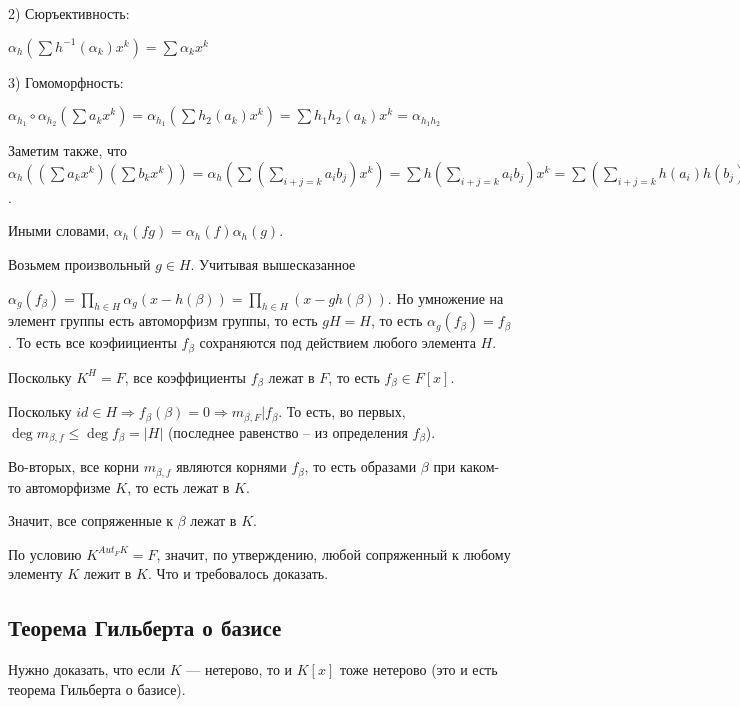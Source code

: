 \documentclass[../main.tex]{subfiles}
\begin{document}
    2) Сюръективность:

    $\alpha_h(\sum h^{-1}(\alpha_k) x^k) = \sum \alpha_kx^k$

    3) Гомоморфность:

    $\alpha_{h_1} \circ \alpha_{h_2}(\sum a_k x^k)
    = \alpha_{h_1}(\sum h_2(a_k) x^k) = \sum h_1 h_2 (a_k) x^k
    = \alpha_{h_1 h_2}$

    Заметим также, что $\alpha_h((\sum a_k x^k)(\sum b_kx^k))
    = \alpha_h(\sum (\sum\limits_{i + j = k} a_ib_j)x^k)
    = \sum h(\sum\limits_{i + j = k} a_ib_j)x^k
    = \sum (\sum\limits_{i + j = k} h(a_i)h(b_j)) x^k
    = (\sum h(a_k)x^k)(\sum h(b_k)x^k)
    = \alpha_h(\sum a_kx^k)\alpha_h(\sum b_kx^k)$.

    Иными словами, $\alpha_h(fg) = \alpha_h(f)\alpha_h(g)$.

    Возьмем произвольный $g \in H$. Учитывая вышесказанное

    $\alpha_g(f_\beta) = \prod\limits_{h \in H} \alpha_g(x - h(\beta))
    =  \prod\limits_{h \in H} (x - gh(\beta))$. Но умножение на элемент
    группы есть автоморфизм группы, то есть $gH = H$, то есть
    $\alpha_g(f_\beta) = f_\beta$. То есть все коэфиициенты $f_\beta$
    сохраняются под действием любого элемента $H$.

    Поскольку $K^H = F$, все
    коэффициенты $f_\beta$ лежат в $F$, то есть $f_\beta \in F[x]$.

    Поскольку  $id \in H \Rightarrow f_\beta(\beta) = 0 \Rightarrow
    m_{\beta, F} | f_\beta$. То есть, во первых, $\deg m_{\beta, f} \leqslant
    \deg f_\beta = |H|$ (последнее равенство -- из определения $f_\beta$).

    Во-вторых, все корни $m_{\beta, f}$ являются корнями $f_\beta$, то есть
    образами $\beta$ при каком-то автоморфизме $K$, то есть лежат в $K$.

    Значит, все сопряженные к $\beta$ лежат в $K$.

    По условию $K^{Aut_FK} = F$, значит, по утверждению, любой сопряженный к
    любому элементу $K$ лежит в $K$. Что и требовалось доказать.



\hypertarget{9.2}{\subsection{Теорема Гильберта о базисе}}

    Нужно доказать, что если $K$ --- нетерово, то и $K[x]$ тоже нетерово
    (это и есть теорема Гильберта о базисе).
\end{document}
